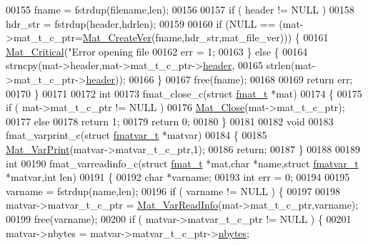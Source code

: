 \begin{DoxyCode}
{00155     fname = fstrdup(filename,len);
00156 
00157     \textcolor{keywordflow}{if} ( header != NULL )
00158         hdr\_str = fstrdup(header,hdrlen);
00159 
00160     \textcolor{keywordflow}{if} (NULL == (mat->mat\_t\_c\_ptr=\hyperlink{group___m_a_t_ga22d404f203af7869c841400e7ad247cf}{Mat\_CreateVer}(fname,hdr\_str,mat\_file\_ver))) \{
00161         \hyperlink{group__mat__util_gaf51f2bfbb5580f575e4dd79757e2b80c}{Mat\_Critical}(\textcolor{stringliteral}{"Error opening file %
00162         err = 1;
00163     \} \textcolor{keywordflow}{else} \{
00164         strncpy(mat->header,mat->mat\_t\_c\_ptr->\hyperlink{struct__mat__t_a5ed5d0e4e3c4d76b626a8a1772d579c4}{header},
00165                 strlen(mat->mat\_t\_c\_ptr->\hyperlink{struct__mat__t_a5ed5d0e4e3c4d76b626a8a1772d579c4}{header}));
00166     \}
00167     free(fname);
00168 
00169     \textcolor{keywordflow}{return} err;
00170 \}
00171 
00172 \textcolor{keywordtype}{int}
00173 fmat\_close\_c(\textcolor{keyword}{struct} \hyperlink{structfmat__t}{fmat\_t} *mat)
00174 \{
00175     \textcolor{keywordflow}{if} ( mat->mat\_t\_c\_ptr != NULL )
00176         \hyperlink{group___m_a_t_ga101c92ff7bde4a2d4615661beba09262}{Mat\_Close}(mat->mat\_t\_c\_ptr);
00177     \textcolor{keywordflow}{else}
00178         \textcolor{keywordflow}{return} 1;
00179     \textcolor{keywordflow}{return} 0;
00180 \}
00181 
00182 \textcolor{keywordtype}{void}
00183 fmat\_varprint\_c(\textcolor{keyword}{struct} \hyperlink{structfmatvar__t}{fmatvar\_t} *matvar)
00184 \{
00185     \hyperlink{group___m_a_t_ga9100c145e338b84b55d5d0795d5d390a}{Mat\_VarPrint}(matvar->matvar\_t\_c\_ptr,1);
00186     \textcolor{keywordflow}{return};
00187 \}
00188 
00189 \textcolor{keywordtype}{int}
00190 fmat\_varreadinfo\_c(\textcolor{keyword}{struct} \hyperlink{structfmat__t}{fmat\_t} *mat,\textcolor{keywordtype}{char} *name,\textcolor{keyword}{struct} \hyperlink{structfmatvar__t}{fmatvar\_t} *matvar,\textcolor{keywordtype}{int} len)
00191 \{
00192     \textcolor{keywordtype}{char} *varname;
00193     \textcolor{keywordtype}{int}   err = 0;
00194 
00195     varname = fstrdup(name,len);
00196     \textcolor{keywordflow}{if} ( varname != NULL ) \{
00197 
00198         matvar->matvar\_t\_c\_ptr = \hyperlink{group___m_a_t_ga46da2e45ed96d3f1a6ec643757f2b086}{Mat\_VarReadInfo}(mat->mat\_t\_c\_ptr,varname);
00199         free(varname);
00200         \textcolor{keywordflow}{if} ( matvar->matvar\_t\_c\_ptr != NULL ) \{
00201             matvar->nbytes     = matvar->matvar\_t\_c\_ptr->\hyperlink{group___m_a_t_abf1c844540503be2df9bb3db93cfe307}{nbytes};
}}
\end{DoxyCode}
